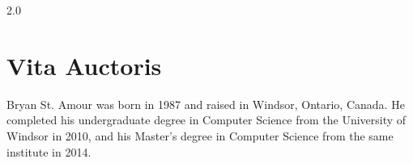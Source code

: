 \documentclass[oneside, 12pt]{book}
\newcommand{\uwindoublespacelen}{2.0}
\newcommand{\uwindefaultspacelen}{\uwindoublespacelen}
\newenvironment{uwindefaultspaceenv}%
{\begin{spacing}{\uwindefaultspacelen}}%
  {\end{spacing}}
\begin{document}
\begin{uwindefaultspaceenv}

\tableofcontents

\listoffigures
\clearpage

\listoftables
\clearpage














\chapter*{Vita Auctoris}

Bryan St. Amour was born in 1987 and raised in Windsor, Ontario, Canada. He completed his undergraduate degree in
Computer Science from the University of Windsor in 2010, and his Master's degree in Computer Science from the same
institute in 2014.


\end{uwindefaultspaceenv}
\end{document}
